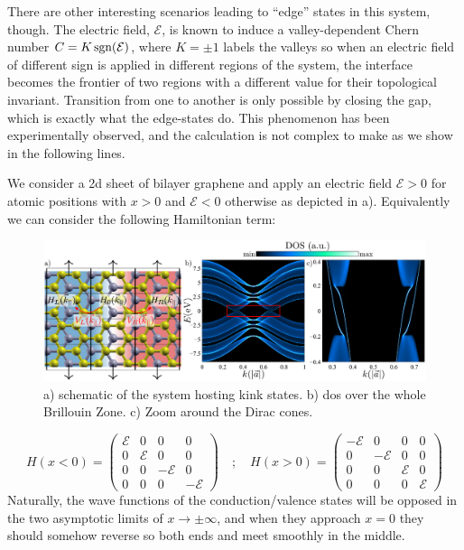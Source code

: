 There are other interesting scenarios leading to ``edge'' states in this system, though.
The electric field, $\mathcal{E}$, is known to induce a valley-dependent Chern number $C=K\operatorname{sgn}({\mathcal{E}})$, where $K=\pm1$ labels the valleys\cite{Martin2008,San-Jose2009} so when an electric field of different sign is applied in different regions of the system\cite{Martin2008,Jung2011,Yin2016,Li2016,Li2018b}, the interface becomes the frontier of two regions with a different value for their topological invariant. Transition from one to another is only possible by closing the gap, which is exactly what the edge-states do.
This phenomenon has been experimentally observed\cite{Li2016}, and the calculation is not complex to make as we show in the following lines.

We consider a \ac{2d} sheet of bilayer graphene and apply an electric field $\mathcal{E}>0$ for atomic positions with $x>0$ and $\mathcal{E}<0$ otherwise as depicted in a). Equivalently we can consider the following Hamiltonian term:
\begin{figure}[h!]
\centering
\includegraphics{graphene_bilayer/figures/kink_states.pdf}
\vspace{-5pt}
\caption{a) schematic of the system hosting kink states. b) \ac{dos} over the whole Brillouin Zone. c) Zoom around the Dirac cones.}
\label{fig:kink_states}
\end{figure}
\begin{equation}
   H(x<0) = \left(\begin{array}{cccc}
   \mathcal{E} & 0 & 0 & 0 \\
   0 & \mathcal{E} & 0 & 0 \\
   0 & 0 & -\mathcal{E} & 0 \\
   0 & 0 & 0 & -\mathcal{E}
   \end{array}\right) \quad;\quad
   H(x>0) = \left(\begin{array}{cccc}
   -\mathcal{E} & 0 & 0 & 0 \\
   0 & -\mathcal{E} & 0 & 0 \\
   0 & 0 & \mathcal{E} & 0 \\
   0 & 0 & 0 & \mathcal{E}
   \end{array}\right)
\end{equation}
Naturally, the wave functions of the conduction/valence states will be opposed in the two asymptotic limits of $x\to\pm\infty$, and when they approach $x=0$ they should somehow reverse so both ends and meet smoothly in the middle.


